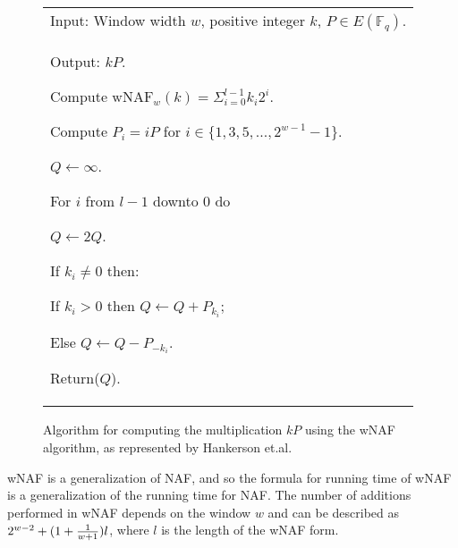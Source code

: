\begin{figure}[htb!]
	\begin{tabular}{|p{\textwidth}|}
		\hline
		Input: Window width \(w\), positive integer \(k\), \(P \in E(\mathbb{F}_q)\).\\
		Output: \(kP\).
		\begin{enumerate*}
			\item Compute \(\text{wNAF}_w(k) = \Sigma^{l-1}_{i=0} k_i 2^i\).
			\item Compute \(P_i = iP\) for \(i \in \{1,3,5,...,2^{w-1}-1\}\).
			\item \(Q \gets \infty\).
			\item For \(i\) from \(l - 1\) downto \(0\) do
			\begin{enumerate*}
				\item \(Q \gets 2Q\).
				\item If \(k_i \neq 0\) then:
				\begin{enumerate*}
					\item If \(k_i > 0\) then \(Q \gets Q + P_{k_i}\);
					\item Else \(Q \gets Q - P_{-k_i}\).
				\end{enumerate*}
			\end{enumerate*}
			\item Return(\(Q\)).
		\end{enumerate*} \\
		\hline
	\end{tabular}
	\caption{Algorithm for computing the multiplication \(kP\) using the wNAF algorithm, as represented by Hankerson et.al.\cite{hankerson2010}}
	\label{fig:wnaf-algorithm}
\end{figure}

wNAF is a generalization of NAF, and so the formula for running time of wNAF is a generalization of the running time for NAF. The number of
additions performed in wNAF depends on the window \(w\) and can be described as \(2^{w-2} + (1 + {1 \over {w + 1}}) l\), where \(l\) is the length
of the wNAF form.\cite{hankerson2010}